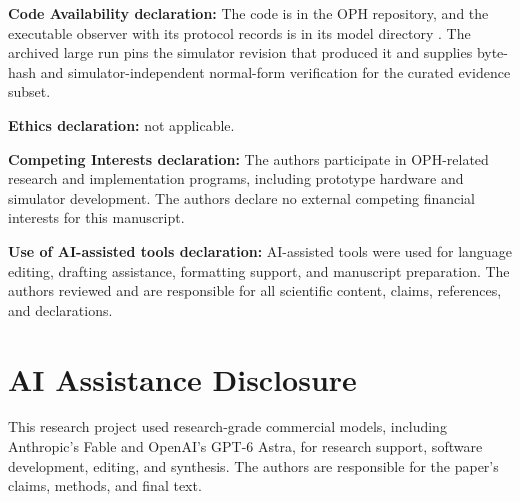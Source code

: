 \documentclass[11pt]{article}
\begin{document}
\noindent\textbf{Code Availability declaration:} The code is in the OPH repository, and the executable observer with its protocol records is in its model directory \cite{ophrepo}. The archived large run pins the simulator revision that produced
it and supplies byte-hash and simulator-independent normal-form verification
for the curated evidence subset.

\noindent\textbf{Ethics declaration:} not applicable.

\noindent\textbf{Competing Interests declaration:} The authors participate in OPH-related research
and implementation programs, including prototype hardware and simulator development. The authors
declare no external competing financial interests for this manuscript.

\noindent\textbf{Use of AI-assisted tools declaration:} AI-assisted tools were used for language
editing, drafting assistance, formatting support, and manuscript preparation. The authors
reviewed and are responsible for all scientific content, claims, references, and declarations.

\section*{AI Assistance Disclosure}
This research project used research-grade commercial models, including
Anthropic's Fable and OpenAI's GPT-6 Astra, for research support, software
development, editing, and synthesis. The authors are responsible for the
paper's claims, methods, and final text.
\end{document}
